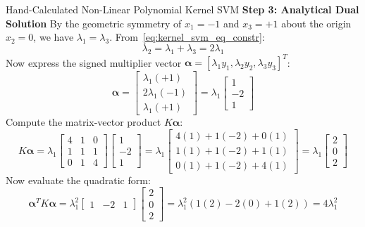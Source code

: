 \begin{examplebox}[breakable]{Hand-Calculated Non-Linear Polynomial Kernel SVM}
\textbf{Step 3: Analytical Dual Solution}
By the geometric symmetry of $x_1 = -1$ and $x_3 = +1$ about the origin $x_2 = 0$, we have $\lambda_1 = \lambda_3$.
From~\eqref{eq:kernel_svm_eq_constr}:
\begin{equation}
\lambda_2 = \lambda_1 + \lambda_3 = 2\lambda_1
\end{equation}
Now express the signed multiplier vector $\boldsymbol{\alpha} = [\lambda_1 y_1, \lambda_2 y_2, \lambda_3 y_3]^T$:
\begin{equation}
\boldsymbol{\alpha} = \begin{bmatrix} \lambda_1(+1) \\ 2\lambda_1(-1) \\ \lambda_1(+1) \end{bmatrix} = \lambda_1 \begin{bmatrix} 1 \\ -2 \\ 1 \end{bmatrix}
\end{equation}
Compute the matrix-vector product $K \boldsymbol{\alpha}$:
\begin{equation}
K \boldsymbol{\alpha} = \lambda_1 \begin{bmatrix} 4 & 1 & 0 \\ 1 & 1 & 1 \\ 0 & 1 & 4 \end{bmatrix} \begin{bmatrix} 1 \\ -2 \\ 1 \end{bmatrix} = \lambda_1 \begin{bmatrix} 4(1) + 1(-2) + 0(1) \\ 1(1) + 1(-2) + 1(1) \\ 0(1) + 1(-2) + 4(1) \end{bmatrix} = \lambda_1 \begin{bmatrix} 2 \\ 0 \\ 2 \end{bmatrix}
\end{equation}
Now evaluate the quadratic form:
\begin{equation}
\boldsymbol{\alpha}^T K \boldsymbol{\alpha} = \lambda_1^2 \begin{bmatrix} 1 & -2 & 1 \end{bmatrix} \begin{bmatrix} 2 \\ 0 \\ 2 \end{bmatrix} = \lambda_1^2 \left( 1(2) - 2(0) + 1(2) \right) = 4\lambda_1^2

\end{equation}
\end{examplebox}
